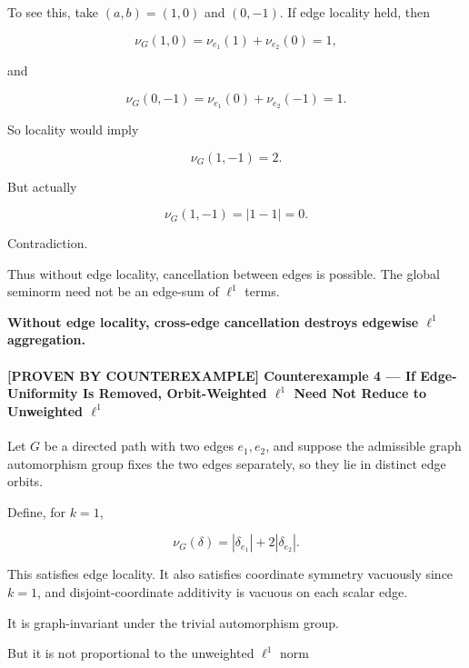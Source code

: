 \documentclass[
  11pt,
]{article}
\renewenvironment{quote}
  {\begin{leftbar}\small}
  {\end{leftbar}}
\begin{document}
To see this, take \((a,b)=(1,0)\) and \((0,-1)\). If edge locality held,
then

\[
\nu_G(1,0)=\nu_{e_1}(1)+\nu_{e_2}(0)=1,
\]

and

\[
\nu_G(0,-1)=\nu_{e_1}(0)+\nu_{e_2}(-1)=1.
\]

So locality would imply

\[
\nu_G(1,-1)=2.
\]

But actually

\[
\nu_G(1,-1)=|1-1|=0.
\]

Contradiction.

Thus without edge locality, cancellation between edges is possible. The
global seminorm need not be an edge-sum of \(\ell^1\) terms.

\begin{quote}
\textbf{Without edge locality, cross-edge cancellation destroys edgewise
\(\ell^1\) aggregation.}
\end{quote}

\hypertarget{proven-by-counterexample-counterexample-4-if-edge-uniformity-is-removed-orbit-weighted-ell1-need-not-reduce-to-unweighted-ell1}{%
\paragraph{\texorpdfstring{\textbf{{[}PROVEN BY COUNTEREXAMPLE{]}
Counterexample 4 --- If Edge-Uniformity Is Removed, Orbit-Weighted
\(\ell^1\) Need Not Reduce to Unweighted
\(\ell^1\)}}{{[}PROVEN BY COUNTEREXAMPLE{]} Counterexample 4 --- If Edge-Uniformity Is Removed, Orbit-Weighted \textbackslash ell\^{}1 Need Not Reduce to Unweighted \textbackslash ell\^{}1}}\label{proven-by-counterexample-counterexample-4-if-edge-uniformity-is-removed-orbit-weighted-ell1-need-not-reduce-to-unweighted-ell1}}

Let \(G\) be a directed path with two edges \(e_1,e_2\), and suppose the
admissible graph automorphism group fixes the two edges separately, so
they lie in distinct edge orbits.

Define, for \(k=1\),

\[
\nu_G(\delta)=|\delta_{e_1}|+2|\delta_{e_2}|.
\]

This satisfies edge locality. It also satisfies coordinate symmetry
vacuously since \(k=1\), and disjoint-coordinate additivity is vacuous
on each scalar edge.

It is graph-invariant under the trivial automorphism group.

But it is not proportional to the unweighted \(\ell^1\) norm
\end{document}
